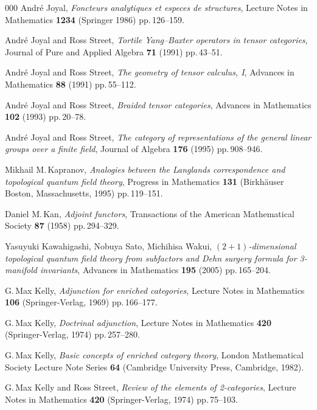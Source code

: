 \documentclass[a4paper,12pt]{article}
\theoremstyle{definition}
\theoremstyle{fact}
\theoremstyle{genquest}
\theoremstyle{step}
\begin{document}
\begin{thebibliography}{000}
 Andr\'e Joyal, \textit{Foncteurs analytiques et especes de structures}, Lecture Notes in Mathematics \textbf{1234} (Springer 1986) pp.\,126--159. 

 Andr\'e Joyal and Ross Street, \textit{Tortile Yang--Baxter operators in tensor categories}, Journal of Pure and Applied Algebra \textbf{71} (1991) pp.\,43--51. 

 Andr\'e Joyal and Ross Street, \textit{The geometry of tensor calculus, I}, Advances in Mathematics \textbf{88} (1991) pp.\,55--112.

  Andr\'e Joyal and Ross Street, \textit{Braided tensor categories}, Advances in Mathematics \textbf{102} (1993) pp.\,20--78.

 Andr\'e Joyal and Ross Street, \textit{The category of representations of the general linear groups over a finite field}, Journal of Algebra \textbf{176} (1995) pp.\,908--946.

 Mikhail M.\,Kapranov, \textit{Analogies between the Langlands correspondence and topological quantum field theory}, Progress in Mathematics \textbf{131} (Birkh\"auser Boston, Massachusetts, 1995) pp.\,119--151.

 Daniel M.\,Kan, \textit{Adjoint functors}, Transactions of the American Mathematical Society \textbf{87} (1958) pp.\,294--329.

 Yasuyuki Kawahigashi, Nobuya Sato, Michihisa Wakui,  \textit{$(2+1)$-dimensional topological quantum field theory from subfactors and Dehn surgery formula for 3-manifold invariants},  Advances in Mathematics \textbf{195} (2005) pp.\,165--204.

 G.\,Max Kelly, \textit{Adjunction for enriched categories}, Lecture Notes in Mathematics \textbf{106} (Springer-Verlag, 1969) pp.\,166--177.

 G.\,Max Kelly, \textit{Doctrinal adjunction}, Lecture Notes in Mathematics \textbf{420} (Springer-Verlag, 1974) pp.\,257--280.

 G.\,Max Kelly, \textit{Basic concepts of enriched category theory}, London Mathematical Society Lecture Note Series \textbf{64} (Cambridge University Press, Cambridge, 1982).

 G.\,Max Kelly and Ross Street, \textit{Review of the elements of 2-categories}, Lecture Notes in Mathematics \textbf{420} (Springer-Verlag, 1974) pp.\,75--103.


\end{thebibliography}
\end{document}
